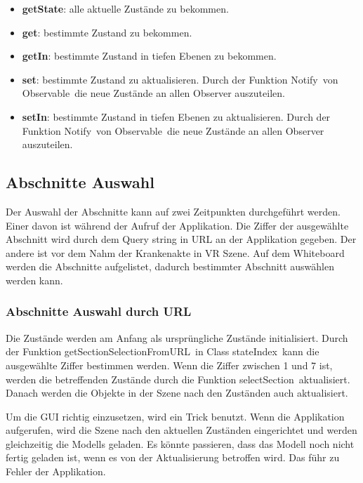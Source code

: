   \begin{itemize}
      \item \textbf{getState}: alle aktuelle Zustände zu bekommen.
      \item \textbf{get}: bestimmte Zustand zu bekommen.
      \item \textbf{getIn}: bestimmte Zustand in tiefen Ebenen zu bekommen.
      \item \textbf{set}: bestimmte Zustand zu aktualisieren. Durch der Funktion \glqq Notify\grqq\ von \glqq Observable\grqq\ die neue Zustände an allen Observer auszuteilen.
      \item \textbf{setIn}: bestimmte Zustand in tiefen Ebenen zu aktualisieren. Durch der Funktion \glqq Notify\grqq\ von \glqq Observable\grqq\ die neue Zustände an allen Observer auszuteilen.
  \end{itemize}
  
 \subsection{Abschnitte Auswahl}
 Der Auswahl der Abschnitte kann auf zwei Zeitpunkten durchgeführt werden. Einer davon ist während der Aufruf der Applikation. Die Ziffer der ausgewählte Abschnitt wird durch dem Query string in URL an der Applikation gegeben. Der andere ist vor dem Nahm der Krankenakte in VR Szene. Auf dem Whiteboard werden die Abschnitte aufgelistet, dadurch bestimmter Abschnitt auswählen werden kann.
 
  \subsubsection{Abschnitte Auswahl durch URL}
  Die Zustände werden am Anfang als ursprüngliche Zustände initialisiert. Durch der Funktion \glqq getSectionSelectionFromURL\grqq\ in Class \glqq stateIndex\grqq\ kann die ausgewählte Ziffer bestimmen werden. Wenn die Ziffer zwischen 1 und 7 ist, werden die betreffenden Zustände durch die Funktion \glqq selectSection\grqq\ aktualisiert. Danach werden die Objekte in der Szene nach den Zuständen auch aktualisiert.
  
  Um die GUI richtig einzusetzen, wird ein Trick benutzt. Wenn die Applikation aufgerufen, wird die Szene nach den aktuellen Zuständen eingerichtet und werden gleichzeitig die Modells geladen. Es könnte passieren, dass das Modell noch nicht fertig geladen ist, wenn es von der Aktualisierung betroffen wird. Das führ zu Fehler der Applikation.
  
